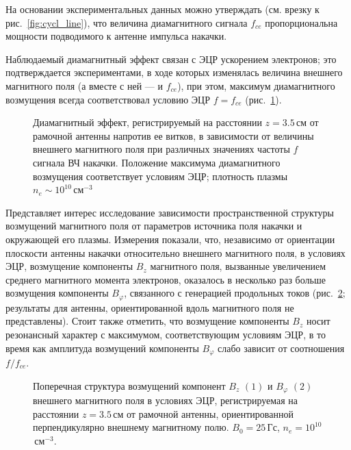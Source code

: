 \documentclass[autoref,10pt]{disser}
\begin{document}
На основании экспериментальных данных можно утверждать (см. врезку к \mbox{рис.~\ref{fig:cycl_line}}), что величина диамагнитного сигнала $f_{ce}$ пропорциональна мощности подводимого к антенне импульса накачки. 

Наблюдаемый диамагнитный эффект связан с ЭЦР ускорением электронов; это подтверждается экспериментами, в ходе которых изменялась величина внешнего магнитного поля (а вместе с ней --- и $f_{ce}$), при этом,  максимум диамагнитного возмущения всегда соответствовал условию ЭЦР $f=f_{ce}$ (\mbox{рис.~\ref{fig:ecr_combine}}).
\begin{figure}[H]
    \centering
    \def\svgwidth{0.45\columnwidth} %
    
    \caption{Диамагнитный эффект, регистрируемый на расстоянии $z=3.5$\,см от рамочной антенны напротив ее витков, в зависимости от величины внешнего магнитного поля при различных значениях частоты $f$ сигнала ВЧ накачки. Положение максимума диамагнитного возмущения соответствует условиям ЭЦР; плотность плазмы $n_{e}\sim{}10^{10}$\,см$^{-3}$}
    \label{fig:ecr_combine}
\end{figure}

Представляет интерес исследование зависимости пространственной структуры возмущений магнитного поля от параметров источника поля накачки и окружающей его плазмы.
Измерения показали, что, независимо от ориентации плоскости антенны накачки относительно внешнего магнитного поля, в условиях ЭЦР, возмущение компоненты $B_{z}$ магнитного поля, вызванные увеличением среднего магнитного момента электронов,  оказалось в несколько раз больше возмущения компоненты $B_{\varphi}$, связанного с генерацией продольных токов (\mbox{рис.~\ref{fig:transverse}}; результаты для антенны, ориентированной вдоль магнитного поля не представлены).  Стоит также отметить, что возмущение компоненты $B_{z}$ носит резонансный характер с максимумом, соответствующим условиям ЭЦР, в то время как амплитуда возмущений компоненты $B_{\varphi}$ слабо зависит от соотношения $f/f_{ce}$.
\begin{figure}[H]
    \centering
    \def\svgwidth{0.6\columnwidth} %
    
    \caption{Поперечная структура возмущений компонент $B_{z}$ $(1)$ и $B_{\varphi}$ $(2)$ внешнего магнитного поля в условиях ЭЦР, регистрируемая на расстоянии $z=3.5$\,см от рамочной антенны, ориентированной перпендикулярно внешнему магнитному полю. $B_{0}=25$\,Гс, $n_{e}=10^{10}$\,см$^{-3}$.}
    \label{fig:transverse}
\end{figure}
\end{document}
